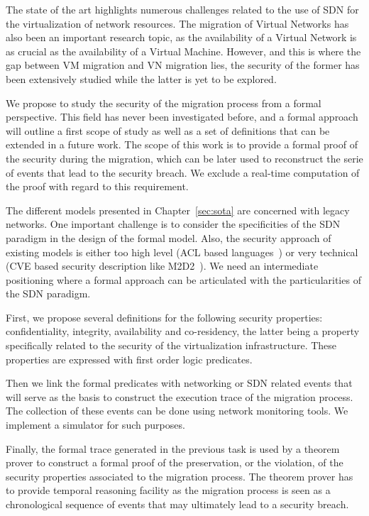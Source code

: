 The state of the art highlights numerous challenges related to the use of SDN for the virtualization of network resources.
The migration of Virtual Networks has also been an important research topic, as the availability of a Virtual Network is as crucial as the availability of a Virtual Machine.
However, and this is where the gap between VM migration and VN migration lies, the security of the former has been extensively studied while the latter is yet to be explored.

We propose to study the security of the migration process from a formal perspective. This field has never been investigated before, and a formal approach will outline a first scope of study as well as a set of definitions that can be extended in a future work.
The scope of this work is to provide a formal proof of the security during the migration, which can be later used to reconstruct the serie of events that lead to the security breach. We exclude a real-time computation of the proof with regard to this requirement.

The different models presented in Chapter~\ref{sec:sota} are concerned with legacy networks.
One important challenge is to consider the specificities of the SDN paradigm in the design of the formal model.
Also, the security approach of existing models is either too high level (ACL based languages~\cite{orbac,mulval-Ou2013}) or very technical (CVE based security description like M2D2~\cite{M2D2-Morin2002}).
We need an intermediate positioning where a formal approach can be articulated with the particularities of the SDN paradigm.

First, we propose several definitions for the following security properties: confidentiality, integrity, availability 
and co-residency, the latter being a property specifically related to the security of the virtualization infrastructure.
These properties are expressed with first order logic predicates.

Then we link the formal predicates with networking or SDN related events that will serve as the basis to construct the execution trace of the migration process.
The collection of these events can be done using network monitoring tools.
We implement a simulator for such purposes.

Finally, the formal trace generated in the previous task is used by a theorem prover to construct a formal proof of the preservation, or the violation, of the security properties associated to the migration process. The theorem prover has to provide temporal reasoning facility as the migration process is seen as a chronological sequence of events that may ultimately lead to a security breach.
